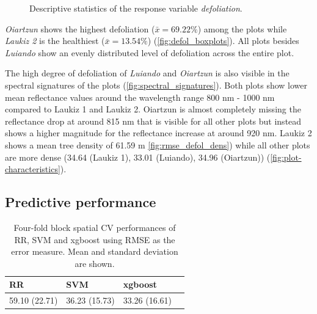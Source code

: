 \documentclass[review]{elsarticle}
\begin{document}
\begin{figure} [t!]
	\begin{center}
		\caption{Descriptive statistics of the response variable \textit{defoliation}.}
		\label{fig:defol_boxplots}
	\end{center}
\end{figure}

\textit{Oiartzun} shows the highest defoliation ($\bar{x} = 69.22 \%$) among the plots while \textit{Laukiz 2} is the healthiest ($\bar{x} = 13.54 \%$) (\autoref{fig:defol_boxplots}).
All plots besides \textit{Luiando} show an evenly distributed level of defoliation across the entire plot.

The high degree of defoliation of \textit{Luiando} and \textit{Oiartzun} is also visible in the spectral signatures of the plots (\autoref{fig:spectral_signatures}).
Both plots show lower mean reflectance values around the wavelength range 800 nm - 1000 nm compared to Laukiz 1 and Laukiz 2.
Oiartzun is almost completely missing the reflectance drop at around 815 nm that is visible for all other plots but instead shows a higher magnitude for the reflectance increase at around 920 nm.
Laukiz 2 shows a mean tree density of 61.59 m \autoref{fig:rmse_defol_dens}) while all other plots are more dense (34.64 (Laukiz 1), 33.01 (Luiando), 34.96 (Oiartzun)) (\autoref{fig:plot-characteristics}).

\subsection{Predictive performance}

\begin{table}[t!]
\centering
\caption[t]{Four-fold block spatial \ac{CV} performances of RR, SVM and xgboost using \ac{RMSE} as the error measure.
	Mean and standard deviation are shown.}
\begingroup\footnotesize
\begin{tabular}{llll}
	RR            & SVM           & xgboost       \\
	\hline
	59.10 (22.71) & 36.23 (15.73) & 33.26 (16.61) \\
	\bottomrule
\end{tabular}
\endgroup
\label{tab:model_comparison}
\end{table}
\end{document}
